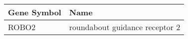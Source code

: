 \begin{tabular}{ll}
\toprule
Gene Symbol &                           Name \\
\midrule
      ROBO2 & roundabout guidance receptor 2 \\
\bottomrule
\end{tabular}
